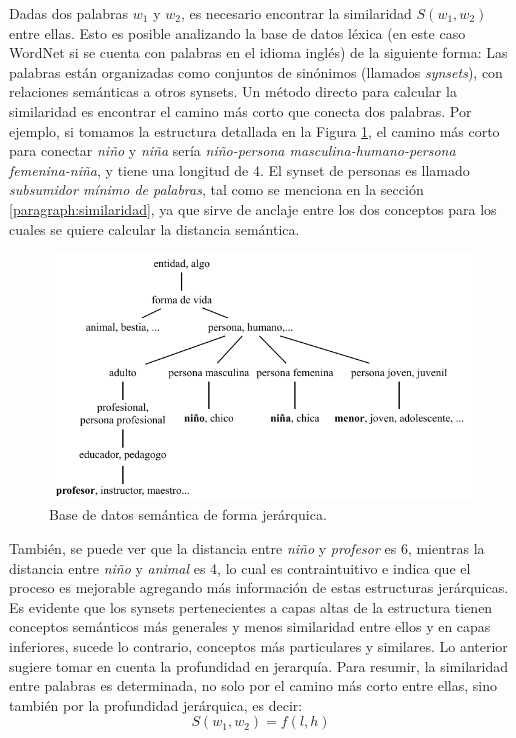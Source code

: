 \bigskip Dadas dos palabras \(w_1\) y \(w_2\), es necesario encontrar la similaridad \(S(w_1,w_2)\) entre ellas. Esto es posible analizando la base de datos léxica (en este caso WordNet si se cuenta con palabras en el idioma inglés) de la siguiente forma: Las palabras están organizadas como conjuntos de sinónimos (llamados \textit{synsets}), con relaciones semánticas a otros synsets. Un método directo para calcular la similaridad es encontrar el camino más corto que conecta dos palabras. Por ejemplo, si tomamos la estructura detallada en la Figura \ref{fig:taxonomiasemantica}, el camino más corto para conectar \textit{niño} y \textit{niña} sería \textit{niño-persona masculina-humano-persona femenina-niña}, y tiene una longitud de \(4\). El synset de personas es llamado \textit{subsumidor mínimo de palabras}, tal como se menciona en la sección \ref{paragraph:similaridad}, ya que sirve de anclaje entre los dos conceptos para los cuales se quiere calcular la distancia semántica.

\begin{figure}[h!]
	\centering
	\includegraphics[width=0.9\linewidth]{7_marco_teorico/imagenes/taxonomia_semantica}
	\caption{Base de datos semántica de forma jerárquica.}
	\label{fig:taxonomiasemantica}
\end{figure}

También, se puede ver que la distancia entre \textit{niño} y \textit{profesor} es 6, mientras la distancia entre \textit{niño} y \textit{animal} es 4, lo cual es contraintuitivo e indica que el proceso es mejorable agregando más información de estas estructuras jerárquicas. Es evidente que los synsets pertenecientes a capas altas de la estructura tienen conceptos semánticos más generales y menos similaridad entre ellos y en capas inferiores, sucede lo contrario, conceptos más particulares y similares. Lo anterior sugiere tomar en cuenta la profundidad en jerarquía. Para resumir, la similaridad entre palabras es determinada, no solo por el camino más corto entre ellas, sino también por la profundidad jerárquica, es decir:
\[S(w_1,w_2)=f(l,h)\]

